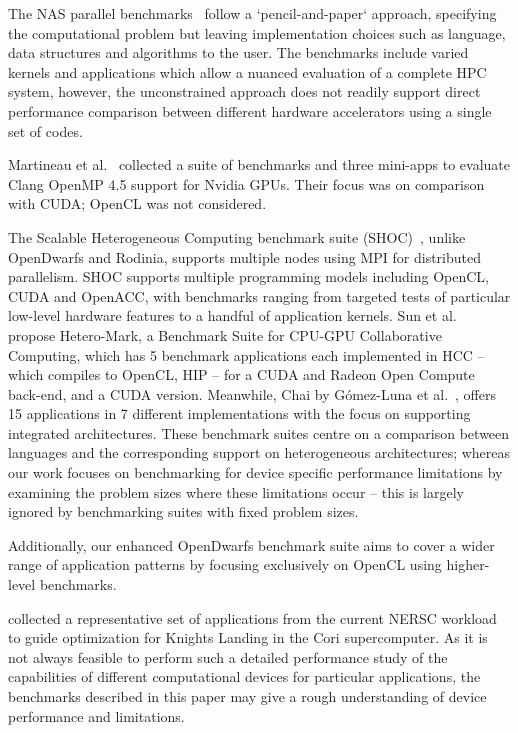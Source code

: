 \documentclass[../document.tex]{subfiles}
\begin{document}
\label{sec:related_work}
	
The NAS parallel benchmarks~\cite{bailey1991parallel} follow a `pencil-and-paper` approach, specifying the computational problem but leaving implementation choices such as language, data structures and algorithms to the user.
The benchmarks include varied kernels and applications which allow a nuanced evaluation of a complete HPC system, however, the unconstrained approach does not readily support direct performance comparison between different hardware accelerators using a single set of codes.

Martineau et al.~\cite{martineau2016performance} collected a suite of benchmarks and three mini-apps to evaluate Clang OpenMP 4.5 support for Nvidia GPUs.
Their focus was on comparison with CUDA; OpenCL was not considered.

The Scalable Heterogeneous Computing benchmark suite (SHOC)~\cite{lopez2015examining}, unlike OpenDwarfs and Rodinia, supports multiple nodes using MPI for distributed parallelism.
SHOC supports multiple programming models including OpenCL, CUDA and OpenACC, with benchmarks ranging from targeted tests of particular low-level hardware features to a handful of application kernels.
Sun et al.~\cite{sun2016} propose Hetero-Mark, a Benchmark Suite for CPU-GPU Collaborative Computing, which has 5 benchmark applications each implemented in HCC -- which compiles to OpenCL, HIP -- for a CUDA and Radeon Open Compute back-end, and a CUDA version.
Meanwhile, Chai by G{\'o}mez-Luna et al.~\cite{gomez2017chai}, offers 15 applications in 7 different implementations with the focus on supporting integrated architectures.
These benchmark suites centre on a comparison between languages and the corresponding support on heterogeneous architectures; whereas our work focuses on benchmarking for device specific performance limitations by examining the problem sizes where these limitations occur -- this is largely ignored by benchmarking suites with fixed problem sizes.

Additionally, our enhanced OpenDwarfs benchmark suite aims to cover a wider range of application patterns by focusing exclusively on OpenCL using higher-level benchmarks.

\citet{barnes2016evaluating} collected a representative set of applications from the current NERSC workload to guide optimization for Knights Landing in the Cori supercomputer.
As it is not always feasible to perform such a detailed performance study of the capabilities of different computational devices for particular applications, the benchmarks described in this paper may give a rough understanding of device performance and limitations.
\end{document}
